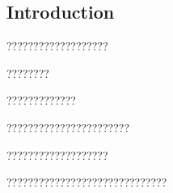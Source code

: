 \documentclass[11pt]{book}
\begin{document}
\begin{ch}
\chapter{Introduction}
???????????????????

????????

?????????????

???????????????????????

???????????????????

??????????????????????????????
\end{ch}
\end{document}
